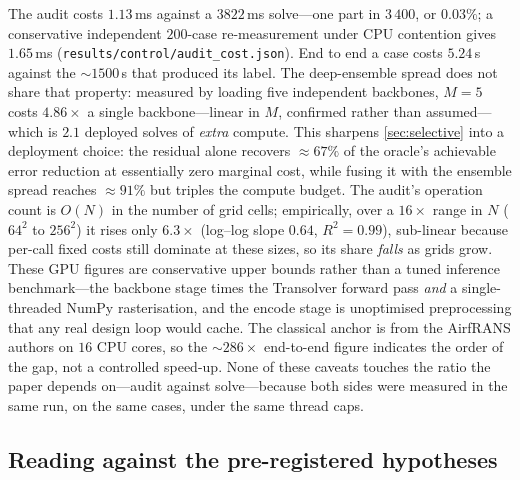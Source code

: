 The audit costs $1.13$\,ms against a $3822$\,ms solve---one part in $3\,400$, or
$\mathbf{0.03\%}$; a conservative independent $200$-case re-measurement under CPU
contention gives $1.65$\,ms (\texttt{results/control/audit\_cost.json}). End to end a case
costs $5.24$\,s against the ${\sim}1500$\,s that produced its label. The deep-ensemble
spread does not share that property: measured by loading five independent backbones,
$M{=}5$ costs $4.86\times$ a single backbone---linear in $M$, confirmed rather than
assumed---which is $2.1$ deployed solves of \emph{extra} compute. This sharpens
\autoref{sec:selective} into a deployment choice: the residual alone recovers $\approx
67\%$ of the oracle's achievable error reduction at essentially zero marginal cost, while
fusing it with the ensemble spread reaches $\approx 91\%$ but triples the compute budget.
The audit's operation count is $O(N)$ in the number of grid cells; empirically, over a
$16\times$ range in $N$ ($64^2$ to $256^2$) it rises only $6.3\times$ (log--log slope
$0.64$, $R^2=0.99$), sub-linear because per-call fixed costs still dominate at these
sizes, so its share \emph{falls} as grids grow. These GPU figures are conservative upper
bounds rather than a tuned inference benchmark---the backbone stage times the Transolver
forward pass \emph{and} a single-threaded NumPy rasterisation, and the encode stage is
unoptimised preprocessing that any real design loop would cache. The classical anchor is
from the AirfRANS authors on $16$ CPU cores, so the ${\sim}286\times$ end-to-end figure
indicates the order of the gap, not a controlled speed-up. None of these caveats touches
the ratio the paper depends on---audit against solve---because both sides were measured in
the same run, on the same cases, under the same thread caps.



\subsection{Reading against the pre-registered hypotheses}

